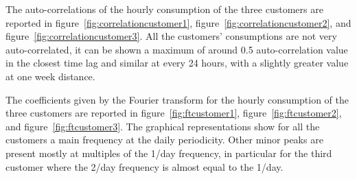 The auto-correlations of the hourly consumption of the three customers are reported in figure~\ref{fig:correlationcustomer1}, figure~\ref{fig:correlationcustomer2}, and figure~\ref{fig:correlationcustomer3}.
All the customers’ consumptions are not very auto-correlated, it can be shown a maximum of around 0.5 auto-correlation value in the closest time lag and similar at every 24 hours, with a slightly greater value at one week distance.

The coefficients given by the Fourier transform for the hourly consumption of the three customers are reported in figure~\ref{fig:ftcustomer1}, figure~\ref{fig:ftcustomer2}, and figure~\ref{fig:ftcustomer3}.
The graphical representations show for all the customers a main frequency at the daily periodicity.
Other minor peaks are present mostly at multiples of the 1/day frequency, in particular for the third customer where the 2/day frequency is almost equal to the 1/day.

